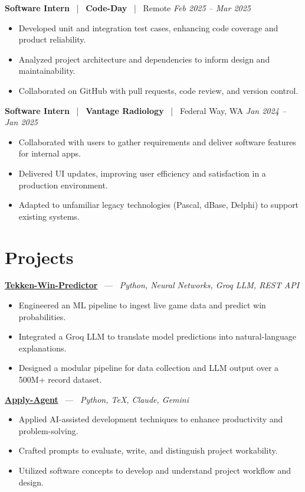 \documentclass[10pt, letterpaper]{article}
\newcommand{\jobhead}[4]{%
  \vspace{5pt}%
  {\bfseries\color{dark}#1}%
  ~{\color{light}|}~%
  {\bfseries\color{navy}#2}%
  ~{\color{light}|}~%
  {\color{light}#3}%
  \hfill{\color{light}\small\textit{#4}}\\[-2pt]%
}
\newcommand{\projhead}[3]{%
  \vspace{5pt}%
  {\bfseries\color{dark}\href{#2}{#1}}%
  ~{\color{light}---}~%
  {\color{light}\small\textit{#3}}\\[-2pt]%
}
\begin{document}
\jobhead{Software Intern}{Code-Day}{Remote}{Feb 2025 – Mar 2025}
\begin{itemize}
  \item Developed unit and integration test cases, enhancing code coverage and product reliability.
  \item Analyzed project architecture and dependencies to inform design and maintainability.
  \item Collaborated on GitHub with pull requests, code review, and version control.
\end{itemize}

\jobhead{Software Intern}{Vantage Radiology}{Federal Way, WA}{Jan 2024 – Jan 2025}
\begin{itemize}
  \item Collaborated with users to gather requirements and deliver software features for internal apps.
  \item Delivered UI updates, improving user efficiency and satisfaction in a production environment.
  \item Adapted to unfamiliar legacy technologies (Pascal, dBase, Delphi) to support existing systems.
\end{itemize}

\section{Projects}

\projhead{Tekken-Win-Predictor}{}{Python, Neural Networks, Groq LLM, REST API}
\begin{itemize}
  \item Engineered an ML pipeline to ingest live game data and predict win probabilities.
  \item Integrated a Groq LLM to translate model predictions into natural-language explanations.
  \item Designed a modular pipeline for data collection and LLM output over a 500M+ record dataset.
\end{itemize}

\projhead{Apply-Agent}{https://github.com/timmyd4/apply-agent}{Python, TeX, Claude, Gemini}
\begin{itemize}
  \item Applied AI-assisted development techniques to enhance productivity and problem-solving.
  \item Crafted prompts to evaluate, write, and distinguish project workability.
  \item Utilized software concepts to develop and understand project workflow and design.
\end{itemize}
\end{document}
